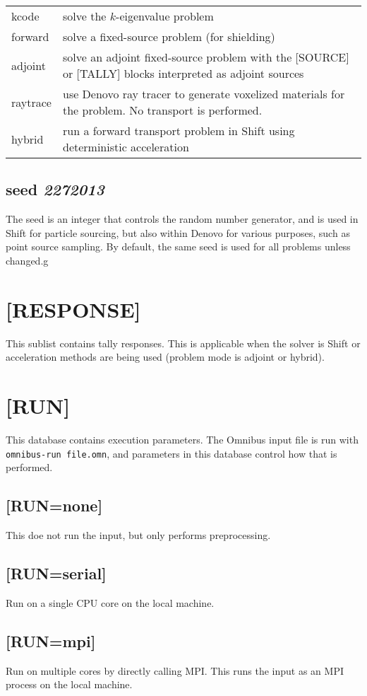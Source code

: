 \documentclass[10pt]{article}
\begin{document}
\begin{tabular}{l l}
kcode & solve the \(k\)-eigenvalue problem\\
forward & solve a fixed-source problem (for shielding)\\
adjoint & solve an adjoint fixed-source problem with the [SOURCE] or [TALLY] blocks interpreted as adjoint sources\\
raytrace & use Denovo ray tracer to generate voxelized materials for the problem. No transport is performed.\\
hybrid & run a forward transport problem in Shift using deterministic acceleration\\
\end{tabular}

\subsection{seed \textit{2272013}}
The seed is an integer that controls the random number generator, and is used in Shift for particle sourcing, but also within Denovo for various purposes, such as point source sampling. By default, the same seed is used for all problems unless changed.g

\section{[RESPONSE]}
This sublist contains tally responses. This is applicable when the solver is Shift or acceleration methods are being used (problem mode is adjoint or hybrid).

\section{[RUN]}
This database contains execution parameters. The Omnibus input file is run with \texttt{omnibus-run file.omn}, and parameters in this database control how that is performed. 

\subsection{[RUN=none]}
This doe not run the input, but only performs preprocessing. 

\subsection{[RUN=serial]}
Run on a single CPU core on the local machine. 

\subsection{[RUN=mpi]}
Run on multiple cores by directly calling MPI. This runs the input as an MPI process on the local machine. 
\end{document}
